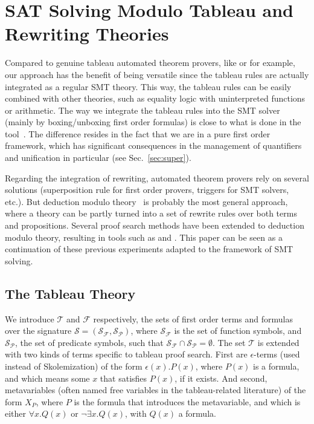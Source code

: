 
\section{SAT Solving Modulo Tableau and Rewriting Theories}
\label{sec:smt}

Compared to genuine tableau automated theorem provers, like \princess{} or
\zenon{} for example, our approach has the benefit of being versatile since the
tableau rules are actually integrated as a regular SMT theory. This way, the
tableau rules can be easily combined with other theories, such as equality logic
with uninterpreted functions or arithmetic. The way we integrate the tableau
rules into the SMT solver (mainly by boxing/unboxing first order formulas) is
close to what is done in the \satallax{} tool~\cite{CEB12}. The difference
resides in the fact that we are in a pure first order framework, which has
significant consequences in the management of quantifiers and unification in
particular (see Sec.~\ref{sec:super}).

Regarding the integration of rewriting, automated theorem provers rely on
several solutions (superposition rule for first order provers, triggers for SMT
solvers, etc.). But deduction modulo theory~\cite{DA03} is probably the most
general approach, where a theory can be partly turned into a set of rewrite
rules over both terms and propositions. Several proof search methods have been
extended to deduction modulo theory, resulting in tools such as \iproverm{} and
\zenm{}. This paper can be seen as a continuation of these previous experiments
adapted to the framework of SMT solving.

\subsection{The Tableau Theory}
\label{sec:tab}

We introduce $\mathcal{T}$ and $\mathcal{F}$ respectively,
the sets of first order terms and formulas over the signature
$\mathcal{S}=(\mathcal{S}_\mathcal{F},\mathcal{S}_\mathcal{P})$, where
$\mathcal{S}_\mathcal{F}$ is the set of function symbols, and
$\mathcal{S}_\mathcal{P}$, the set of predicate symbols, such that
$\mathcal{S}_\mathcal{F}\cap\mathcal{S}_\mathcal{P}=\emptyset$. The set
$\mathcal{T}$ is extended with two kinds of terms specific to tableau proof
search. First are $\epsilon{}$-terms (used instead of Skolemization) of the form
$\epsilon(x).P(x)$, where $P(x)$ is a formula, and which means some $x$ that
satisfies $P(x)$, if it exists. And second, metavariables (often named free variables in
the tableau-related literature) of the form $X_P$, where $P$ is the formula that
introduces the metavariable, and which is either $\forall{}x.Q(x)$ or
$\neg\exists{}x.Q(x)$, with $Q(x)$ a formula.

